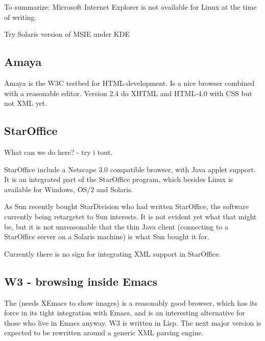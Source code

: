 To summarize:  Microsoft Internet Explorer is not available for Linux
at the time of writing.

\textsf{Try Solaris version of MSIE under KDE}

\subsection{Amaya}
\label{sec:amaya}

Amaya is the W3C testbed for HTML-development.  Is a nice browser
combined with a reasonable editor.  Version 2.4 do XHTML and HTML-4.0
with CSS but not XML yet.




\subsection{StarOffice}
\label{sec:staroffice}

\textsf{What can we do here?} - try i tout.

StarOffice include a Netscape \textsf{3.0} compatible browser, with
Java applet support.  It is an integrated part of the StarOffice
program, which besides Linux is available for Windows, OS/2 and
Solaris.

As Sun recently bought StarDivision who had written StarOffice, the
software currently being retargetet to Sun interests.  It is not
evident yet what that might be, but it is not unreasonable that the
thin Java client (connecting to a StarOffice server on a Solaris
machine) is what Sun bought it for.

Currently there is no sign for integrating XML support in StarOffice.

\subsection{W3 - browsing inside Emacs}
\label{sec:w3-browsing-inside-emacs}

The  (needs XEmacs to show images) is a reasonably good browser,
which has its force in its tight integration with Emacs, and is an
interesting alternative for those who live in Emacs anyway.  W3 is
written in Lisp.  The next major version is expected to be rewritten
around a generic XML parsing engine.



